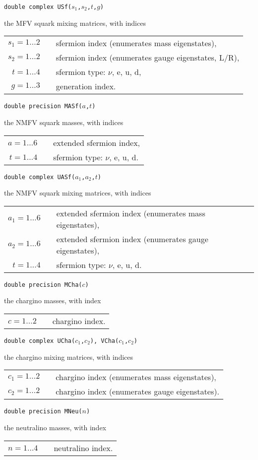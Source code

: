 \documentclass[12pt,a4paper]{report}
\newcommand{\CODE}[1]{\texttt{#1}}
\newcommand{\VAROUT}[1]{%
  \item[\fbox{\scriptsize\textsc{out}}]
  \CODE{#1}\par}
\begin{document}
\VAROUT{double complex USf($s_1$,$s_2$,$t$,$g$)}
the MFV squark mixing matrices, with indices \\
\begin{tabular}{rcl}
  $s_1 = 1\dots 2$ && sfermion index (enumerates mass eigenstates), \\
  $s_2 = 1\dots 2$ && sfermion index (enumerates gauge eigenstates, L/R), \\
  $t = 1\dots 4$   && sfermion type: $\nu$, e, u, d, \\
  $g = 1\dots 3$   && generation index.
\end{tabular}

\VAROUT{double precision MASf($a$,$t$)}
the NMFV squark masses, with indices \\
\begin{tabular}{rcl}
  $a = 1\dots 6$ && extended sfermion index, \\
  $t = 1\dots 4$ && sfermion type: $\nu$, e, u, d.
\end{tabular}

\VAROUT{double complex UASf($a_1$,$a_2$,$t$)}
the NMFV squark mixing matrices, with indices \\
\begin{tabular}{rcl}
  $a_1 = 1\dots 6$ && extended sfermion index (enumerates mass eigenstates), \\
  $a_2 = 1\dots 6$ && extended sfermion index (enumerates gauge eigenstates), \\
  $t = 1\dots 4$   && sfermion type: $\nu$, e, u, d.
\end{tabular}

\VAROUT{double precision MCha($c$)}
the chargino masses, with index \\
\begin{tabular}{rcl}
  $c = 1\dots 2$ && chargino index.
\end{tabular}

\VAROUT{double complex UCha($c_1$,$c_2$), VCha($c_1$,$c_2$)}
the chargino mixing matrices, with indices \\
\begin{tabular}{rcl}
  $c_1 = 1\dots 2$ && chargino index (enumerates mass eigenstates), \\
  $c_2 = 1\dots 2$ && chargino index (enumerates gauge eigenstates).
\end{tabular}

\VAROUT{double precision MNeu($n$)}
the neutralino masses, with index \\
\begin{tabular}{rcl}
  $n = 1\dots 4$ && neutralino index.
\end{tabular}
\end{document}
